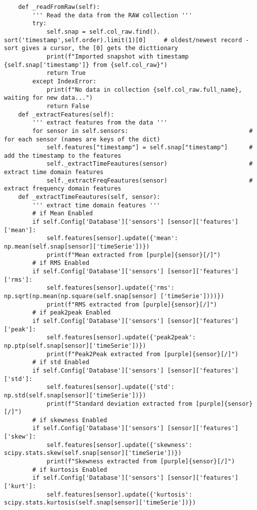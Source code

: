 \begin{verbatim}
    def _readFromRaw(self):
        ''' Read the data from the RAW collection '''
        try:
            self.snap = self.col_raw.find(). sort('timestamp',self.order).limit(1)[0]     # oldest/newest record - sort gives a cursor, the [0] gets the dicttionary
            print(f"Imported snapshot with timestamp {self.snap['timestamp']} from {self.col_raw}")
            return True    
        except IndexError:
            print(f"No data in collection {self.col_raw.full_name}, waiting for new data...")
            return False
    def _extractFeatures(self):
        ''' extract features from the data '''
        for sensor in self.sensors:                                  # for each sensor (names are keys of the dict)
            self.features["timestamp"] = self.snap["timestamp"]      # add the timestamp to the features
            self._extractTimeFeautures(sensor)                       # extract time domain features
            self._extractFreqFeautures(sensor)                       # extract frequency domain features
    def _extractTimeFeautures(self, sensor):
        ''' extract time domain features '''
        # if Mean Enabled
        if self.Config['Database']['sensors'] [sensor]['features']['mean']:
            self.features[sensor].update({'mean': np.mean(self.snap[sensor]['timeSerie'])})
            print(f"Mean extracted from [purple]{sensor}[/]")
        # if RMS Enabled
        if self.Config['Database']['sensors'] [sensor]['features']['rms']:
            self.features[sensor].update({'rms': np.sqrt(np.mean(np.square(self.snap[sensor] ['timeSerie'])))})
            print(f"RMS extracted from [purple]{sensor}[/]")
        # if peak2peak Enabled
        if self.Config['Database']['sensors'] [sensor]['features']['peak']:
            self.features[sensor].update({'peak2peak': np.ptp(self.snap[sensor]['timeSerie'])})
            print(f"Peak2Peak extracted from [purple]{sensor}[/]")
        # if std Enabled
        if self.Config['Database']['sensors'] [sensor]['features']['std']:
            self.features[sensor].update({'std': np.std(self.snap[sensor]['timeSerie'])})
            print(f"Standard deviation extracted from [purple]{sensor}[/]")
        # if skewness Enabled
        if self.Config['Database']['sensors'] [sensor]['features']['skew']:
            self.features[sensor].update({'skewness': scipy.stats.skew(self.snap[sensor]['timeSerie'])})
            print(f"Skewness extracted from [purple]{sensor}[/]")
        # if kurtosis Enabled
        if self.Config['Database']['sensors'] [sensor]['features']['kurt']:
            self.features[sensor].update({'kurtosis': scipy.stats.kurtosis(self.snap[sensor]['timeSerie'])})

\end{verbatim}
